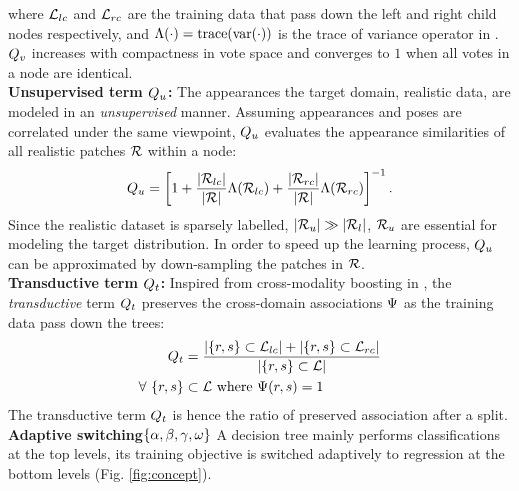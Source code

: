 where $\mathcal{L}_{lc}$ and $\mathcal{L}_{rc}$ are the training data that pass down the left and right child nodes respectively, and $\mathrm{\Lambda}(\cdot) = \mathrm{trace}(\mathrm{var}(\cdot))$ is the trace of variance operator in \cite{Gall_PAMI_11}. 
$Q_{v}$ increases with compactness in vote space and converges to $1$ when all votes in a node are identical. \\ 
\textbf{Unsupervised term $Q_{u}$:} The appearances the target domain, \ie realistic data, are modeled in an \emph{unsupervised} manner. 
Assuming appearances and poses are correlated under the same viewpoint, $Q_{u}$ evaluates the appearance similarities of all realistic patches $\mathcal{R}$ within a node:    
\begin{equation}
	Q_{u} = \left[ 1 + 
	\frac{|\mathcal{R}_{lc}|}{|\mathcal{R}|} \mathrm{\Lambda}(\mathcal{R}_{lc}) +  
\frac{|\mathcal{R}_{rc}|}{|\mathcal{R}|} \mathrm{\Lambda}(\mathcal{R}_{rc}) \right]^{-1}.  
	\label{eq:usterm}
\end{equation}
Since the realistic dataset is sparsely labelled, \ie$|\mathcal{R}_{u}| \gg |\mathcal{R}_{l}|$, $\mathcal{R}_{u}$ are essential for modeling the target distribution. 
In order to speed up the learning process, $Q_{u}$ can be approximated by down-sampling the patches in $\mathcal{R}$. \\  
\textbf{Transductive term $Q_{t}$:} 
Inspired from cross-modality boosting in \cite{Bronstein_CVPR_11}, 
the \emph{transductive} term $Q_{t}$ preserves the cross-domain associations $\mathrm{\Psi}$ as the training data pass down the trees: 
\begin{equation}
	\begin{split}
	Q_{t} &= 
	\frac{|\{r,s\} \subset \mathcal{L}_{lc}| +  
	|\{r,s\} \subset \mathcal{L}_{rc}|}{|\{r,s\} \subset \mathcal{L}|} \\   
	\forall\ \{r,s\} &\subset \mathcal{L} \mbox{ where } \mathrm{\Psi}(r,s) = 1
	\end{split}
	\label{eq:pairterm}
\end{equation}
The transductive term $Q_{t}$ is hence the ratio of preserved association after a split. \\
\textbf{Adaptive switching$\{\alpha, \beta, \gamma, \omega\}$} 
A decision tree mainly performs classifications at the top levels, its training objective is switched adaptively to regression at the bottom levels (Fig. \ref{fig:concept}). 
